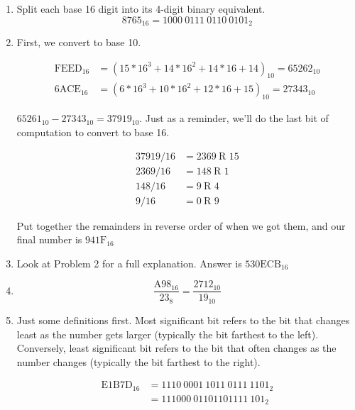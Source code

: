 \documentclass{pset_template}
\begin{document}
\begin{enumerate}

\item
Split each base 16 digit into its 4-digit binary equivalent.
\begin{equation*}
8765_{16} = \boxed{1000~0111~0110~0101_{2}}
\end{equation*}

\item
First, we convert to base 10.

\begin{align*}
\text{FEED}_{16} & = (15 * 16^3 + 14 * 16^2 + 14 * 16 + 14)_{10} = 65262_{10}\\
\text{6ACE}_{16} & = (6 * 16^3 + 10 * 16^2 + 12 * 16 + 15)_{10} = 27343_{10}
\end{align*}

$65261_{10} - 27343_{10} = 37919_{10}$.
Just as a reminder, we'll do the last bit of computation to convert to base 16.

\begin{align*}
37919/16 &= 2369~\text{R 15}\\
2369/16 &= 148~\text{R 1}\\
148/16 &= 9~\text{R 4}\\
9/16 &= 0~\text{R 9}
\end{align*}

Put together the remainders in reverse order of when we got them, and our final number is $\boxed{\text{941F}_{16}}$

\item
Look at Problem 2 for a full explanation. Answer is $\boxed{\text{530ECB}_{16}}$

\item
\begin{equation*}
\frac{\text{A98}_{16}}{23_{8}} =  \boxed{\frac{\text{2712}_{10}}{19_{10}}}
\end{equation*}

\item
Just some definitions first. 
Most significant bit refers to the bit that changes least as the number gets larger 
(typically the bit farthest to the left). 
Conversely, least significant bit refers to the bit that often changes as the number changes
(typically the bit farthest to the right).

\begin{align*}
\text{E1B7D}_{16} &= 1110~0001~1011~0111~1101_2\\
&= 111000~01101101111~101_2
\end{align*}


\end{enumerate}
\end{document}

